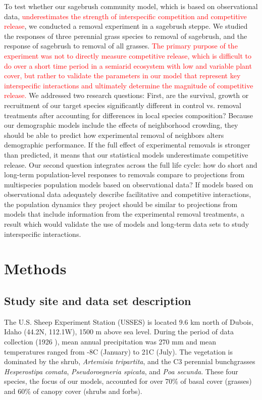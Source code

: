 \documentclass[11pt]{article}
\newcommand{\new}{\textcolor{red}}
\begin{document}
\begin{doublespacing}
To test whether our sagebrush community model, which is based on observational data, \new{underestimates the strength of interspecific competition and competitive release}, we conducted a removal experiment in a sagebrush steppe. We studied the responses of three perennial grass species to removal of sagebrush, and the response of sagebrush to removal of all grasses. \new{The primary purpose of the experiment was not to directly measure competitive release, which is difficult to do over a short time period in a semiarid ecosystem with low and variable plant cover, but rather to validate the parameters in our model that represent key interspecific interactions and ultimately determine the magnitude of competitive release.} We addressed two research questions: First, are the survival, growth or recruitment of our target species significantly different in control vs. removal treatments after accounting for differences in local species composition? Because our demographic models include the effects of neighborhood crowding, they should be able to predict how experimental removal of neighbors alters demographic performance. If the full effect of experimental removals is stronger than predicted, it means that our statistical models underestimate competitive release.  Our second question integrates across the full life cycle: how do short and long-term population-level responses to removals compare to projections from multispecies population models based on observational data? If models based on observational data adequately describe facilitative and competitive interactions, the population dynamics they project should be similar to projections from models that include information from the experimental removal treatments, a result which would validate the use of models and long-term data sets to study interspecific interactions. 

\section*{Methods}

\subsection*{Study site and data set description}

The U.S. Sheep Experiment Station (USSES) is located 9.6 km north of Dubois, Idaho (44.2\degree N, 112.1\degree W), 1500 m above sea level. During the period of data collection (1926 ), mean annual precipitation was 270 mm and mean temperatures ranged from -8\degree C (January) to 21\degree C (July). The vegetation is dominated by the shrub, \textit{Artemisia tripartita}, and the C3  perennial bunchgrasses \textit{Hesperostipa comata}, \textit{Pseudoroegneria spicata},  and \textit{Poa secunda}. These four species, the focus of our models, accounted for over 70\% of basal cover (grasses) and 60\% of canopy cover (shrubs and forbs). 


\end{doublespacing}
\end{document}
